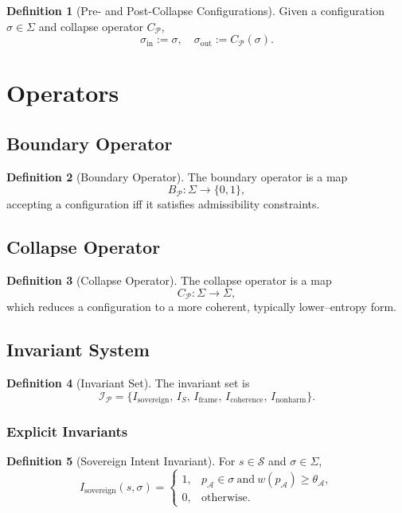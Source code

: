 \documentclass[12pt]{article}
\theoremstyle{definition}
\newtheorem{definition}{Definition}[section]
\theoremstyle{plain}
\begin{document}
\begin{definition}[Pre- and Post-Collapse Configurations]
Given a configuration \(\sigma \in \Sigma\) and collapse operator \(C_{\mathcal{P}}\),
\[
\sigma_{\mathrm{in}} := \sigma, \quad
\sigma_{\mathrm{out}} := C_{\mathcal{P}}(\sigma).
\]
\end{definition}

\section{Operators}

\subsection{Boundary Operator}

\begin{definition}[Boundary Operator]
The boundary operator is a map
\[
B_{\mathcal{P}} : \Sigma \to \{0,1\},
\]
accepting a configuration iff it satisfies admissibility constraints.
\end{definition}

\subsection{Collapse Operator}

\begin{definition}[Collapse Operator]
The collapse operator is a map
\[
C_{\mathcal{P}} : \Sigma \to \Sigma,
\]
which reduces a configuration to a more coherent, typically lower--entropy form.
\end{definition}

\subsection{Invariant System}

\begin{definition}[Invariant Set]
The invariant set is
\[
\mathcal{I}_{\mathcal{P}} =
\{ I_{\mathrm{sovereign}},\,
   I_{S},\,
   I_{\mathrm{frame}},\,
   I_{\mathrm{coherence}},\,
   I_{\mathrm{nonharm}} \}.
\]
\end{definition}

\subsubsection{Explicit Invariants}

\begin{definition}[Sovereign Intent Invariant]
For \(s \in \mathcal{S}\) and \(\sigma \in \Sigma\),
\[
I_{\mathrm{sovereign}}(s,\sigma) =
\begin{cases}
1, & p_{\mathcal{A}} \in \sigma \ \text{and}\ w(p_{\mathcal{A}}) \ge \theta_{\mathcal{A}},\\
0, & \text{otherwise}.
\end{cases}
\]
\end{definition}
\end{document}
